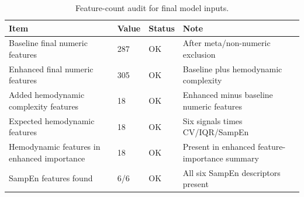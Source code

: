 \begin{table}[!t]
\centering
\caption{Feature-count audit for final model inputs.}
\label{tab:phase8_feature_counts}
\footnotesize
\renewcommand{\arraystretch}{1.12}
\begin{tabular*}{\textwidth}{@{\extracolsep{\fill}}llll}
\toprule
\textbf{Item} & \textbf{Value} & \textbf{Status} & \textbf{Note} \\
\midrule
Baseline final numeric features & 287 & OK & After meta/non-numeric exclusion \\
Enhanced final numeric features & 305 & OK & Baseline plus hemodynamic complexity \\
Added hemodynamic complexity features & 18 & OK & Enhanced minus baseline numeric features \\
Expected hemodynamic features & 18 & OK & Six signals times CV/IQR/SampEn \\
Hemodynamic features in enhanced importance & 18 & OK & Present in enhanced feature-importance summary \\
SampEn features found & 6/6 & OK & All six SampEn descriptors present \\
\bottomrule
\end{tabular*}
\end{table}

